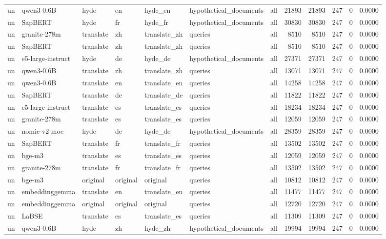\begin{tabular}{lllllllrrrrr}
un & qwen3-0.6B & hyde & en & hyde\_en & hypothetical\_documents & all & 21893 & 21893 & 247 & 0 & 0.0000 \\
un & SapBERT & hyde & fr & hyde\_fr & hypothetical\_documents & all & 30830 & 30830 & 247 & 0 & 0.0000 \\
un & granite-278m & translate & zh & translate\_zh & queries & all & 8510 & 8510 & 247 & 0 & 0.0000 \\
un & SapBERT & translate & zh & translate\_zh & queries & all & 8510 & 8510 & 247 & 0 & 0.0000 \\
un & e5-large-instruct & hyde & de & hyde\_de & hypothetical\_documents & all & 27371 & 27371 & 247 & 0 & 0.0000 \\
un & qwen3-0.6B & translate & zh & translate\_zh & queries & all & 13071 & 13071 & 247 & 0 & 0.0000 \\
un & qwen3-0.6B & translate & en & translate\_en & queries & all & 14258 & 14258 & 247 & 0 & 0.0000 \\
un & SapBERT & translate & de & translate\_de & queries & all & 11822 & 11822 & 247 & 0 & 0.0000 \\
un & e5-large-instruct & translate & es & translate\_es & queries & all & 18234 & 18234 & 247 & 0 & 0.0000 \\
un & granite-278m & translate & es & translate\_es & queries & all & 12059 & 12059 & 247 & 0 & 0.0000 \\
un & nomic-v2-moe & hyde & de & hyde\_de & hypothetical\_documents & all & 28359 & 28359 & 247 & 0 & 0.0000 \\
un & SapBERT & translate & fr & translate\_fr & queries & all & 13502 & 13502 & 247 & 0 & 0.0000 \\
un & bge-m3 & translate & es & translate\_es & queries & all & 12059 & 12059 & 247 & 0 & 0.0000 \\
un & granite-278m & translate & fr & translate\_fr & queries & all & 13502 & 13502 & 247 & 0 & 0.0000 \\
un & bge-m3 & original & original & original & queries & all & 10812 & 10812 & 247 & 0 & 0.0000 \\
un & embeddinggemma & translate & en & translate\_en & queries & all & 11477 & 11477 & 247 & 0 & 0.0000 \\
un & embeddinggemma & original & original & original & queries & all & 12720 & 12720 & 247 & 0 & 0.0000 \\
un & LaBSE & translate & es & translate\_es & queries & all & 11309 & 11309 & 247 & 0 & 0.0000 \\
un & qwen3-0.6B & hyde & zh & hyde\_zh & hypothetical\_documents & all & 19994 & 19994 & 247 & 0 & 0.0000 \\

\end{tabular}
